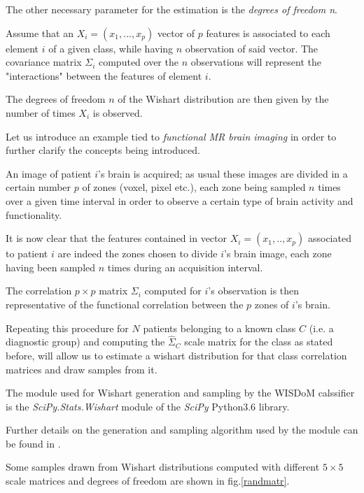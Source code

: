 \documentclass[12pt,openright,twoside,a4paper]{book}
\begin{document}
The other necessary parameter for the estimation is the \textit{degrees of freedom n}.

Assume that an $X_i=(x_1, ..., x_p)$ vector of $p$ features is associated to each element $i$ of a given class, while having $n$ observation of said vector. The covariance matrix $\Sigma_i$ computed over the $n$ observations will represent the "interactions" between the features of element $i$.

The degrees of freedom  $n$ of the Wishart distribution are then given by the number of times $X_i$ is observed.

Let us introduce an example tied to \textit{functional MR brain imaging } in order to further clarify the concepts being introduced. 

An image of patient $i$'s brain is acquired; as usual these images are divided in a certain number $p$ of zones (voxel, pixel etc.), each zone being sampled $n$ times over a given time interval in order to observe a certain type of brain activity and functionality.

It is now clear that the features contained in vector $X_i=(x_1,..,x_p)$ associated to patient $i$ are indeed the zones chosen to divide $i$'s brain image, each zone having been sampled $n$ times during an acquisition interval.

The correlation $p \times p$ matrix $\Sigma_i$ computed for $i$'s observation is then representative of the functional correlation between the $p$ zones of $i$'s brain.

Repeating this procedure for $N$ patients belonging to a known class $C$ (i.e. a diagnostic group) and computing the $\hat{\Sigma}_C$ scale matrix for the class as stated before, will allow us to estimate a wishart distribution for that class correlation matrices and draw samples from it.

\vspace{5mm}

The module used for Wishart generation and sampling by the WISDoM calssifier is the \textit{SciPy.Stats.Wishart} module of the \textit{SciPy} Python3.6 library.

Further details on the generation and sampling algorithm used  by the module can be found in \cite{WishGen}.

Some  samples drawn from Wishart distributions computed with different  $5 \times 5$ scale matrices and degrees of freedom are shown in fig.\ref{randmatr}.

\clearpage
\end{document}
